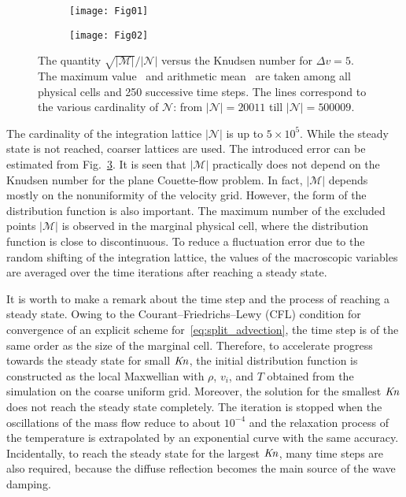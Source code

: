 \documentclass[]{jfm}
\newcommand{\Kn}{\mbox{\textit{Kn}}}
\newcommand{\Nu}{\mathcal{N}}
\newcommand{\Mu}{\mathcal{M}}
\begin{document}
\begin{figure}
    \centering
    \begin{subfigure}[b]{.5\linewidth}
        \texttt{[image: Fig01]}
        \caption{}
        \label{fig:exclusions-max}
    \end{subfigure}%
    \begin{subfigure}[b]{.5\linewidth}
        \texttt{[image: Fig02]}
        \caption{}
        \label{fig:exclusions-mean}
    \end{subfigure}
    \caption{The quantity \(\sqrt{|\Mu|}/|\Nu|\) versus the Knudsen number for \(\Delta{v}=5\).
        The maximum value~ and arithmetic mean~
        are taken among all physical cells and 250 successive time steps.
        The lines correspond to the various cardinality of \(\Nu\):
        from \(|\Nu| = 20011\) till \(|\Nu| = 500009\).}
    \label{fig:exclusions}
\end{figure}

The cardinality of the integration lattice \(|\Nu|\) is up to \(5\times10^5\).
While the steady state is not reached, coarser lattices are used.
The introduced error can be estimated from Fig.~\ref{fig:exclusions}.
It is seen that \(|\Mu|\) practically does not depend on the Knudsen number for the plane Couette-flow problem.
In fact, \(|\Mu|\) depends mostly on the nonuniformity of the velocity grid.
However, the form of the distribution function is also important.
The maximum number of the excluded points \(|\Mu|\) is observed in the marginal physical cell,
where the distribution function is close to discontinuous.
To reduce a fluctuation error due to the random shifting of the integration lattice,
the values of the macroscopic variables are averaged over the time iterations
after reaching a steady state.

It is worth to make a remark about the time step and the process of reaching a steady state.
Owing to the Courant--Friedrichs--Lewy (CFL) condition for convergence of an explicit scheme for~\eqref{eq:split_advection},
the time step is of the same order as the size of the marginal cell.
Therefore, to accelerate progress towards the steady state for small \(\Kn\),
the initial distribution function is constructed as the local Maxwellian
with \(\rho\), \(v_i\), and \(T\) obtained from the simulation on the coarse uniform grid.
Moreover, the solution for the smallest \(\Kn\) does not reach the steady state completely.
The iteration is stopped when the oscillations of the mass flow reduce to about \(10^{-4}\)
and the relaxation process of the temperature is extrapolated by an exponential curve with the same accuracy.
Incidentally, to reach the steady state for the largest \(\Kn\), many time steps are also required,
because the diffuse reflection becomes the main source of the wave damping.
\end{document}
